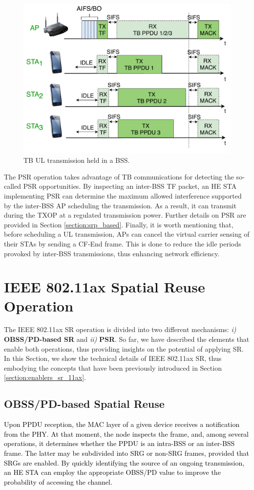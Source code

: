 \documentclass[preprint,12pt]{elsarticle}
\theoremstyle{plain}
\begin{document}
\begin{figure}[ht!]
	\centering
	\includegraphics[width=.5\columnwidth]{fig_8}
	\caption{TB UL transmission held in a BSS.}
	\label{fig:TB_transmission_example}
\end{figure}

The PSR operation takes advantage of TB communications for detecting the so-called PSR opportunities. By inspecting an inter-BSS TF packet, an HE STA implementing PSR can determine the maximum allowed interference supported by the inter-BSS AP scheduling the transmission. As a result, it can transmit during the TXOP at a regulated transmission power. Further details on PSR are provided in Section \ref{section:srp_based}. Finally, it is worth mentioning that, before scheduling a UL transmission, APs can cancel the virtual carrier sensing of their STAs by sending a CF-End frame. This is done to reduce the idle periods provoked by inter-BSS transmissions, thus enhancing network efficiency. 


\section{IEEE 802.11ax Spatial Reuse Operation}
\label{section:operation_sr_11ax}
The IEEE 802.11ax SR operation is divided into two different mechanisms: \emph{i)} \textbf{OBSS/PD-based SR} and \emph{ii)} \textbf{PSR}. So far, we have described the elements that enable both operations, thus providing insights on the potential of applying SR. In this Section, we show the technical details of IEEE 802.11ax SR, thus embodying the concepts that have been previously introduced in Section \ref{section:enablers_sr_11ax}.

\subsection{OBSS/PD-based Spatial Reuse}
\label{section:obss_pd_based}
\textcolor{black}{Upon PPDU reception, the MAC layer of a given device receives a notification from the PHY. At that moment, the node inspects the frame, and, among several operations, it determines whether the PPDU is an intra-BSS or an inter-BSS frame. The latter may be subdivided into SRG or non-SRG frames, provided that SRGs are enabled. By quickly identifying the source of an ongoing transmission, an HE STA can employ the appropriate OBSS/PD value to improve the probability of accessing the channel.}
\end{document}
